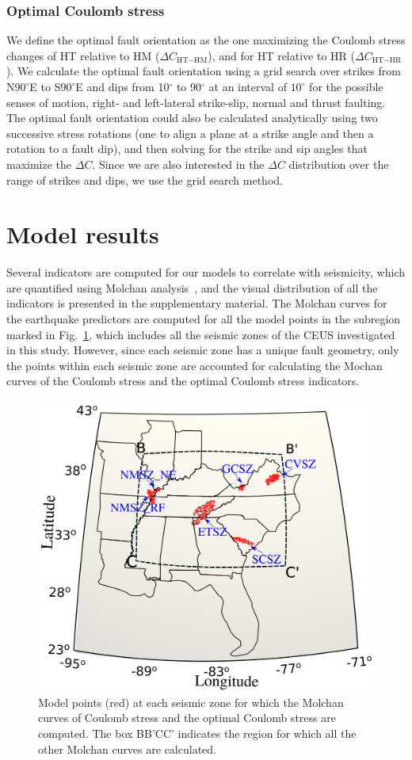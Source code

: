 \documentclass[draft,linenumbers]{agujournal2018}
\begin{document}
\subsubsection{Optimal Coulomb stress}
We define the optimal fault orientation as the one maximizing the Coulomb stress changes of HT relative to HM ($\Delta C_{\text{HT}-\text{HM}}$), and for HT relative to HR ($\Delta C_{\text{HT}-\text{HR}}$). We calculate the optimal fault orientation using a grid search over strikes from N$90^\circ$E to S$90^\circ$E and dips from 10$^\circ$ to 90$^\circ$ at an interval of $10^\circ$ for the possible senses of motion, right- and left-lateral strike-slip, normal and thrust faulting. The optimal fault orientation could also be calculated analytically using two successive stress rotations (one to align a plane at a strike angle and then a rotation to a fault dip), and then solving for the strike and sip angles that maximize the $\Delta C$. Since we are also interested in the $\Delta C$ distribution over the range of strikes and dips, we use the grid search method.

\section{Model results}
Several indicators are computed for our models to correlate with seismicity, which are quantified using Molchan analysis~\citep{becker2015western}, and the visual distribution of all the indicators is presented in the supplementary material. The Molchan curves for the earthquake predictors are computed for all the model points in the subregion marked in Fig.~\ref{zones}, which includes all the seismic zones of the CEUS investigated in this study. However, since each seismic zone has a unique fault geometry, only the points within each seismic zone are accounted for calculating the Mochan curves of the Coulomb stress and the optimal Coulomb stress indicators. 
%
\begin{figure}
\centering
	\includegraphics[width=0.6\linewidth]{figures/seismic_zones.png}
	\caption{Model points (red) at each seismic zone for which the Molchan curves of Coulomb stress and the optimal Coulomb stress are computed. The box BB'CC' indicates the region for which all the other Molchan curves are calculated. }
	\label{zones}
\end{figure}
\end{document}
